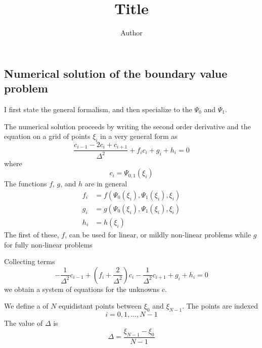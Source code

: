 \documentclass[12pt]{article}%
\begin{document}
\title{Title}
\author{Author}
\maketitle

\subsection{Numerical solution of the boundary value problem}

I first state the general formalism, and then specialize to the $\Psi_{0}$ and
$\Psi_{1}$.

The numerical solution proceeds by writing the second order derivative and the
equation on a grid of points $\xi_{i}$ in a very general form as%
\begin{equation}
\frac{c_{i-1}-2c_{i}+c_{i+1}}{\Delta^{2}}+f_{i}c_{i}+g_{i}+h_{i}=0
\label{eq:2nd-order-BVP-ODE-discretization}%
\end{equation}
where%
\begin{equation}
c_{i}=\Psi_{0,1}\left(  \xi_{i}\right)
\end{equation}
The functions $f$, $g$, and $h$ are in general%
\begin{align}
f_{i}  &  =f\left(  \Psi_{0}\left(  \xi_{i}\right)  ,\Psi_{1}\left(  \xi
_{i}\right)  ,\xi_{i}\right) \\
g_{i}  &  =g\left(  \Psi_{0}\left(  \xi_{i}\right)  ,\Psi_{1}\left(  \xi
_{i}\right)  ,\xi_{i}\right) \\
h_{i}  &  =h\left(  \xi_{i}\right)
\end{align}
The first of these, $f$, can be used for linear, or mildly non-linear problems
while $g$ for fully non-linear problems

Collecting terms%
\begin{equation}
-\frac{1}{\Delta^{2}}c_{i-1}+\left(  f_{i}+\frac{2}{\Delta^{2}}\right)
c_{i}-\frac{1}{\Delta^{2}}c_{i+1}+g_{i}+h_{i}=0
\end{equation}
we obtain a system of equations for the unknowns $c$.

We define a of $N$ equidistant points between $\xi_{0}$ and $\xi_{N-1}$. The
points are indexed
\begin{equation}
i=0,1,\ldots,N-1
\end{equation}
The value of $\Delta$ is
\begin{equation}
\Delta=\frac{\xi_{N-1}-\xi_{0}}{N-1}%
\end{equation}
\end{document}
